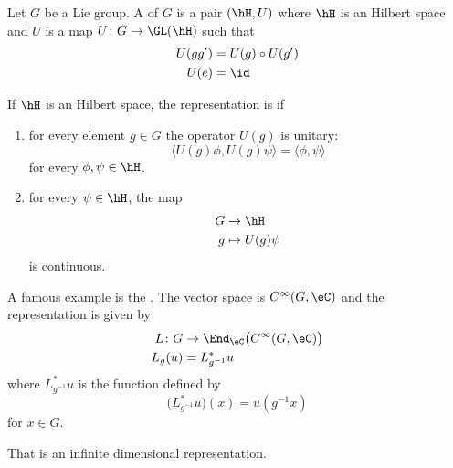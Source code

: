 Let $G$ be a Lie group. A  of $G$ is a pair $(\hH,U)$ where $\hH$ is an Hilbert space and $U$ is a map $U\colon G\to \GL(\hH)$ such that
\begin{equation}
	\begin{aligned}[]
		U(gg')&=U(g)\circ U(g')\\
		U(e)&=\id
	\end{aligned}
\end{equation}

\begin{definition}
	If $\hH$ is an Hilbert space, the representation is  if
	\begin{enumerate}

		\item
			for every element $g\in G$ the operator $U(g)$ is unitary:
			\begin{equation}
				\langle U(g)\phi, U(g)\psi\rangle =\langle \phi, \psi\rangle 
			\end{equation}
			for every $\phi,\psi\in\hH$.

		\item
			for every $\psi\in\hH$, the map
			\begin{equation}
				\begin{aligned}
					G&\to \hH \\
					g&\mapsto U(g)\psi 
				\end{aligned}
			\end{equation}
			is continuous.
	\end{enumerate}
\end{definition}

A famous example is the . The vector space is $ C^{\infty}(G,\eC)$ and the representation is given by
\begin{equation}
	\begin{aligned}
		L\colon G&\to \End_{\eC}\big(  C^{\infty}(G,\eC) \big) \\
		L_g(u)&=L_{g^{-1}}^*u
	\end{aligned}
\end{equation}
where $L_{g^{-1}}^*u$ is the function defined by
\begin{equation}
	\big(  L^*_{g^{-1}}u  \big)(x)=u(g^{-1}x)
\end{equation}
for $x\in G$. 

That is an infinite dimensional representation.

